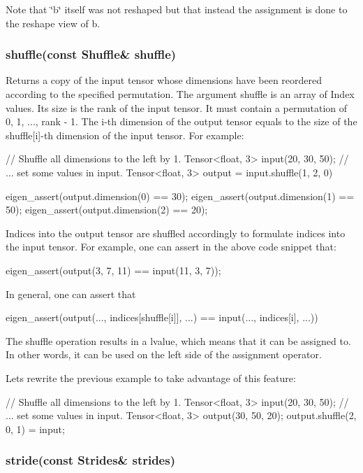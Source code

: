 Note that \char`\"{}b\char`\"{} itself was not reshaped but that instead the assignment is done to the reshape view of b.

\subsubsection*{shuffle(const Shuffle\& shuffle)}

Returns a copy of the input tensor whose dimensions have been reordered according to the specified permutation. The argument shuffle is an array of Index values. Its size is the rank of the input tensor. It must contain a permutation of 0, 1, ..., rank -\/ 1. The i-\/th dimension of the output tensor equals to the size of the shuffle\mbox{[}i\mbox{]}-\/th dimension of the input tensor. For example\+: \begin{DoxyVerb}// Shuffle all dimensions to the left by 1.
Tensor<float, 3> input(20, 30, 50);
// ... set some values in input.
Tensor<float, 3> output = input.shuffle({1, 2, 0})

eigen_assert(output.dimension(0) == 30);
eigen_assert(output.dimension(1) == 50);
eigen_assert(output.dimension(2) == 20);
\end{DoxyVerb}


Indices into the output tensor are shuffled accordingly to formulate indices into the input tensor. For example, one can assert in the above code snippet that\+: \begin{DoxyVerb}eigen_assert(output(3, 7, 11) == input(11, 3, 7));
\end{DoxyVerb}


In general, one can assert that \begin{DoxyVerb}eigen_assert(output(..., indices[shuffle[i]], ...) ==
             input(..., indices[i], ...))
\end{DoxyVerb}


The shuffle operation results in a lvalue, which means that it can be assigned to. In other words, it can be used on the left side of the assignment operator.

Let\textquotesingle{}s rewrite the previous example to take advantage of this feature\+: \begin{DoxyVerb}// Shuffle all dimensions to the left by 1.
Tensor<float, 3> input(20, 30, 50);
// ... set some values in input.
Tensor<float, 3> output(30, 50, 20);
output.shuffle({2, 0, 1}) = input;
\end{DoxyVerb}


\subsubsection*{stride(const Strides\& strides)}

